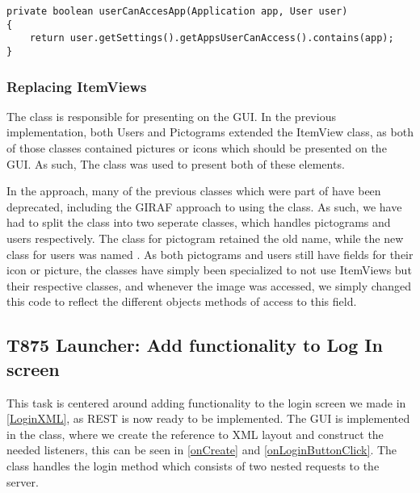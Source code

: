 \begin{minipage}[H]{\linewidth}
\begin{lstlisting}[caption = New method which replaces the functionality of the ProfileApplicationController, label = ucaa] 
private boolean userCanAccesApp(Application app, User user) 
{
	return user.getSettings().getAppsUserCanAccess().contains(app);
}
\end{lstlisting}
\end{minipage}

\subsubsection{Replacing ItemViews}
The  class is responsible for presenting
 on the GUI. In the previous implementation, both Users and
Pictograms extended the ItemView class, as both of those classes contained
pictures or icons which should be presented on the GUI. As such, The
 class was used to present both of these
elements.\nl

In the  approach, many of the previous classes which were
part of  have been deprecated, including the GIRAF approach to
using the  class. As such, we have had to split the
 class into two seperate classes, which handles
pictograms and users respectively. The class for pictogram retained the old
name, while the new class for users was named . As both
pictograms and users still have fields for their icon or picture, the classes
have simply been specialized to not use ItemViews but their respective classes,
and whenever the image was accessed, we simply changed this code to reflect the
different objects methods of access to this field.




\subsection{T875 Launcher: Add functionality to Log In screen}
This task is centered around adding functionality to the login screen we made
in \autoref{LoginXML}, as REST is now ready to be implemented. The GUI is
implemented in the  class, where we create the reference
to XML layout and construct the needed listeners, this can be seen in
\autoref{onCreate} and \autoref{onLoginButtonClick}. The 
class handles the login method which consists of two nested requests to the
server.\nl

